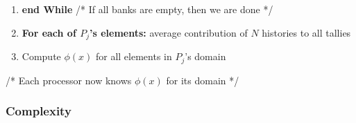 \documentclass[12pt]{article}
\begin{document}
{{\begin{algorithm}
\begin{enumerate}
\begin{enumerate}
         \begin{itemize}
            \item Inform $P_{j+1}$ bank size to receive
            \item Send(rightbank, destination=$P_{j+1}$)
         \end{itemize}
       \item \textbf{IF} size(leftbank) $> 0$:
         \begin{itemize}
             \item Inform $P_{j-1}$ bank size to receive
            \item Send(leftbank, destination=$P_{j-1}$)
         \end{itemize}
       \item \textbf{IF} recieving banks: 
         \begin{itemize}
              \item Recieve banks into one list of particles $\rightarrow mylist$
          \end{itemize}
      \item Synchronization among processors /* Ensure all banks have been received */
      \item \textbf{For each} particle in $mylist$
          \begin{itemize}
              \item Execute steps \ref{itm:start} to \ref{itm:end} on particle
          \end{itemize}
     \item \textbf{IF} (size(rightbank) = 0 \& size(leftbank) = 0) done := true
     \item Compute logical OR using \verb{MPI_Reduce{ on $done$'s, stored in $alldone$
    \end{enumerate}
    \item[] \textbf{end While} /* If all banks are empty, then we are done */
    \item \textbf{For each of $P_j$'s elements:} average contribution of $N$ histories to all tallies
    \item Compute $\phi(x)$ for all elements in $P_j$'s domain
\end{enumerate}
/* Each processor now knows $\phi(x)$ for its domain */
\end{algorithm}

\subsubsection{Complexity}

}}
\end{document}
